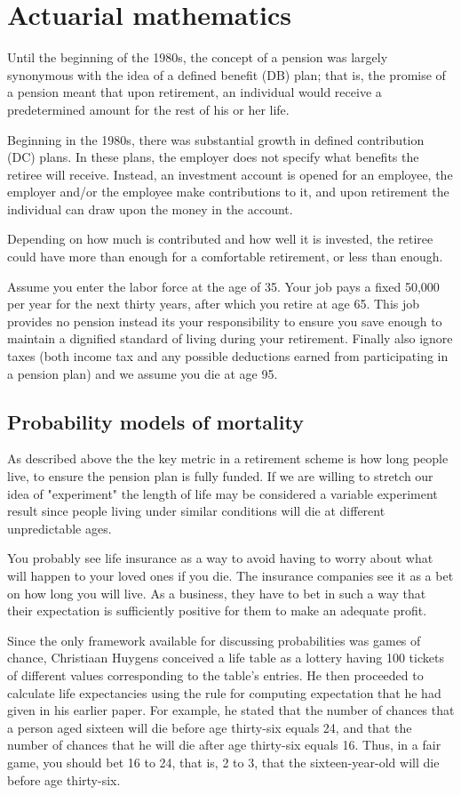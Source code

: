 \chapter{Actuarial mathematics}
Until the beginning of the 1980s, the concept of a pension was largely synonymous with the idea of a defined benefit (DB) plan; that is, the promise of a pension meant that upon retirement, an individual would receive a predetermined amount for the rest of his or her life.

Beginning in the 1980s, there was substantial growth in defined contribution (DC) plans. In these plans, the employer does not specify what benefits the retiree will receive. Instead, an investment account is opened for an employee, the employer and/or the employee make contributions to it, and upon retirement the individual can draw upon the money in the account.

Depending on how much is contributed and how well it is invested, the retiree could have more than enough for a comfortable retirement, or less than enough.

Assume you enter the labor force at the age of 35. Your job pays a fixed 50,000 per year for the next thirty years, after which you retire at age 65. This job provides no pension instead its your responsibility to ensure you save enough to maintain a dignified standard of living during your retirement. Finally also ignore taxes (both income tax and any possible deductions earned from participating in a pension plan) and we assume you die at age 95.

\section{Probability models of mortality}
As described above the  the key metric in a retirement scheme is how long people live, to ensure the pension plan is fully funded. If we are willing to stretch our idea of "experiment" the length of life may be considered a variable experiment result since people living under similar conditions will die at different unpredictable ages.

You probably see life insurance as a way to avoid having to worry about what will happen to your loved ones if you die. The insurance companies see it as a bet on how long you will live. As a business, they have to bet in such a way that their expectation is sufficiently positive for them to make an adequate profit.

Since the only framework available for discussing probabilities was games of chance, Christiaan Huygens conceived a life table as a lottery having 100 tickets of different values corresponding to the table’s entries. He then proceeded to calculate life expectancies using the rule for computing expectation that he had given in his earlier paper. For example, he stated that the number of chances that a person aged sixteen will die before age thirty-six equals 24, and that the number of chances that he will die after age thirty-six equals 16. Thus, in a fair game, you should bet 16 to 24, that is, 2 to 3, that the sixteen-year-old will die before age thirty-six.

